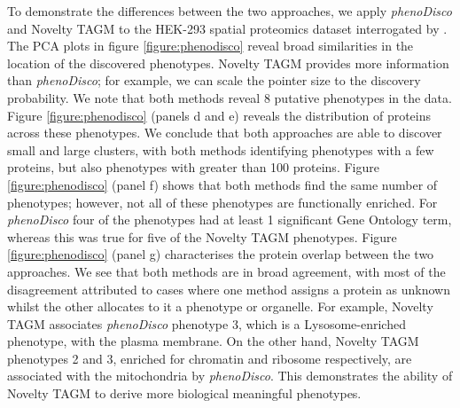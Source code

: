 \documentclass[12pt,english]{article}
\begin{document}
To demonstrate the differences between the two approaches, we apply \textit{phenoDisco} and Novelty TAGM to the HEK-293 spatial proteomics dataset interrogated by \cite{Breckels:2013}. The PCA plots in figure \ref{figure:phenodisco} reveal broad similarities in the location of the discovered phenotypes. Novelty TAGM provides more information than \textit{phenoDisco}; for example, we can scale the pointer size to the discovery probability. We note that both methods reveal 8 putative phenotypes in the data. Figure \ref{figure:phenodisco} (panels d and e) reveals the distribution of proteins across these phenotypes. We conclude that both approaches are able to discover small and large clusters, with both methods identifying phenotypes with a few proteins, but also phenotypes with greater than 100 proteins. Figure \ref{figure:phenodisco} (panel f) shows that both methods find the same number of phenotypes; however, not all of these phenotypes are functionally enriched. For \textit{phenoDisco} four of the phenotypes had at least 1 significant Gene Ontology term, whereas this was true for five of the Novelty TAGM phenotypes. Figure \ref{figure:phenodisco} (panel g) characterises the protein overlap between the two approaches. We see that both methods are in broad agreement, with most of the disagreement attributed to cases where one method assigns a protein as unknown whilst the other allocates to it a phenotype or organelle. For example, Novelty TAGM associates \textit{phenoDisco} phenotype 3, which is a Lysosome-enriched phenotype, with the plasma membrane. On the other hand, Novelty TAGM phenotypes 2 and 3, enriched for chromatin and ribosome respectively, are associated with the mitochondria by \textit{phenoDisco}. This demonstrates the ability of Novelty TAGM to derive more biological meaningful phenotypes.
\end{document}
